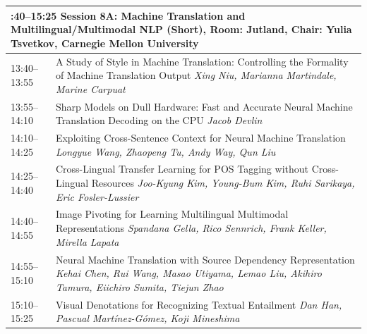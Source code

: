 \documentclass{book}
\renewcommand{\large}{\fontsize{72}{80}\selectfont}
\renewcommand{\large}{\fontsize{82}{90}\selectfont}
\begin{document}
\begin{tabular}{p{20cm}p{70cm}}
  \multicolumn{2}{p{\textwidth}}{\bfseries\large 13:40--15:25 Session 8A: Machine Translation and Multilingual/Multimodal NLP (Short), Room:  Jutland, Chair:  Yulia Tsvetkov, Carnegie Mellon University} \\\hline

    
    13:40--13:55
    &	A Study of Style in Machine Translation: Controlling the Formality of Machine Translation Output \newline 
    {\itshape Xing Niu, Marianna Martindale, Marine Carpuat} \\
    
    13:55--14:10
    &	Sharp Models on Dull Hardware: Fast and Accurate Neural Machine Translation Decoding on the CPU \newline 
    {\itshape Jacob Devlin} \\
    
    14:10--14:25
    &	Exploiting Cross-Sentence Context for Neural Machine Translation \newline 
    {\itshape Longyue Wang, Zhaopeng Tu, Andy Way, Qun Liu} \\
    
    14:25--14:40
    &	Cross-Lingual Transfer Learning for POS Tagging without Cross-Lingual Resources \newline 
    {\itshape Joo-Kyung Kim, Young-Bum Kim, Ruhi Sarikaya, Eric Fosler-Lussier} \\
    
    14:40--14:55
    &	Image Pivoting for Learning Multilingual Multimodal Representations \newline 
    {\itshape Spandana Gella, Rico Sennrich, Frank Keller, Mirella Lapata} \\
    
    14:55--15:10
    &	Neural Machine Translation with Source Dependency Representation \newline 
    {\itshape Kehai Chen, Rui Wang, Masao Utiyama, Lemao Liu, Akihiro Tamura, Eiichiro Sumita, Tiejun Zhao} \\
    
    15:10--15:25
    &	Visual Denotations for Recognizing Textual Entailment \newline 
    {\itshape Dan Han, Pascual Martínez-Gómez, Koji Mineshima} \\
    
\end{tabular}
\vspace*{\fill}
\end{document}
